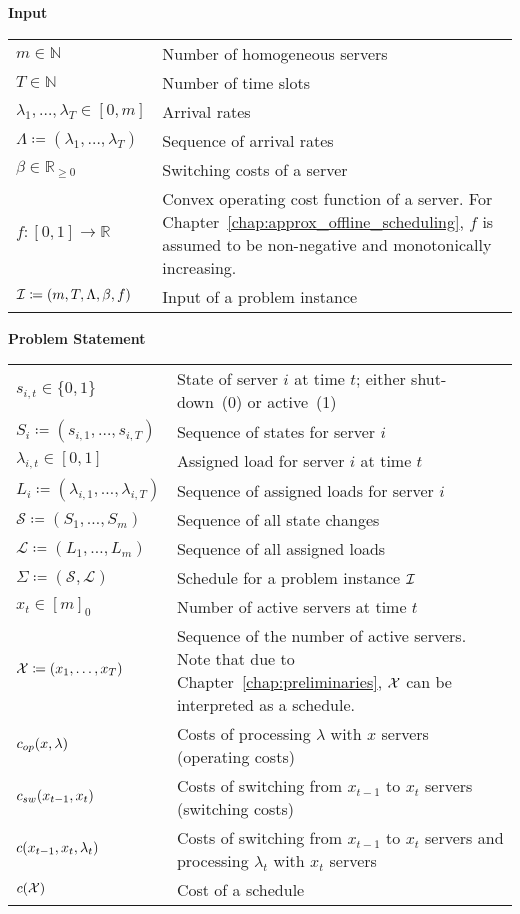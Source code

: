 
\large{\textbf{Input}}
\bgroup
\def\arraystretch{1.5}%
\begin{longtable}{p{} p{}}
  $m\in\mathbb{N}$ & Number of homogeneous servers \\
  $T\in\mathbb{N}$& Number of time slots\\
  $\lambda_1,\dotsc,\lambda_{T}\in[0,m]$& Arrival rates\\
  $\Lambda\coloneqq(\lambda_1,\dotsc,\lambda_T)$& Sequence of arrival rates\\
  $\beta\in\mathbb{R}_{\ge 0}$& Switching costs of a server\\
  $f:[0,1]\rightarrow\mathbb{R}$& Convex operating cost function of a server. For Chapter~\ref{chap:approx_offline_scheduling}, $f$ is assumed to be non-negative and monotonically increasing.\\
  $\mathcal{I}\coloneqq(m,T,\Lambda,\beta,f)$& Input of a problem instance
\end{longtable}
\large{\textbf{Problem Statement}}
\begin{longtable}{p{} p{}}
  $s_{i,t}\in\{0,1\}$& State of server $i$ at time $t$; either shut-down~(0) or active~(1)\\
  $S_i\coloneqq(s_{i,1},\dotsc,s_{i,T})$& Sequence of states for server $i$\\
  $\lambda_{i,t}\in[0,1]$& Assigned load for server $i$ at time $t$\\
  $L_i\coloneqq(\lambda_{i,1},\dotsc,\lambda_{i,T})$& Sequence of assigned loads for server $i$\\
  $\mathcal{S}\coloneqq(S_1,\dotsc,S_m)$& Sequence of all state changes\\
  $\mathcal{L}\coloneqq(L_1,\dotsc,L_m)$& Sequence of all assigned loads\\
  $\Sigma\coloneqq(\mathcal{S},\mathcal{L})$& Schedule for a problem instance $\mathcal{I}$\\
  $x_t\in[m]_0$& Number of active servers at time $t$\\
  $\mathcal{X}\coloneqq(x_1,\ldots,x_T)$& Sequence of the number of active servers. Note that due to Chapter~\ref{chap:preliminaries}, $\mathcal{X}$ can be interpreted as a schedule.\\
  $c_{op}(x,\lambda)$& Costs of processing $\lambda$ with $x$ servers (operating costs)\\
  $c_{sw}(x_{t-1},x_{t})$& Costs of switching from $x_{t-1}$ to $x_t$ servers (switching costs)\\
  $c(x_{t-1},x_{t},\lambda_t)$& Costs of switching from $x_{t-1}$ to $x_t$ servers and processing $\lambda_t$ with $x_t$ servers\\
  $c(\mathcal{X})$& Cost of a schedule
\end{longtable}
